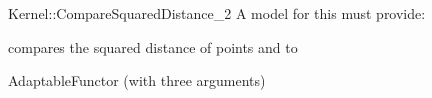 \begin{ccRefFunctionObjectConcept}{Kernel::CompareSquaredDistance_2}
A model for this must provide:


      {compares the squared distance of points  and  to }

\ccRefines
AdaptableFunctor (with three arguments)

\ccSeeAlso

 \\
 \\

\end{ccRefFunctionObjectConcept}
